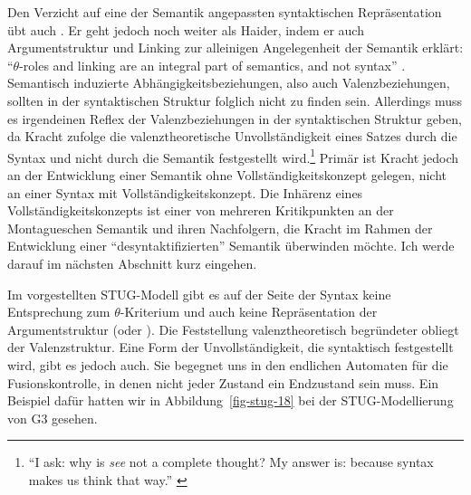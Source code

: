 {Den Verzicht auf eine der Semantik angepassten syntaktischen Repräsentation übt auch \cite{Kracht:07,Kracht:11}. Er geht jedoch noch weiter als Haider, indem er auch Argumentstruktur und Linking zur alleinigen Angelegenheit der Semantik erklärt: "`$\theta$-roles and linking are an integral part of semantics, and not syntax"' \citep[48]{Kracht:07}. Semantisch induzierte Abhängigkeitsbeziehungen, also auch Valenzbeziehungen, sollten in der syntaktischen Struktur folglich nicht zu finden sein. Allerdings muss es irgendeinen Reflex der Valenzbeziehungen in der syntaktischen Struktur geben, da Kracht zufolge die valenztheoretische Unvollständigkeit eines Satzes durch die Syntax und nicht durch die Semantik festgestellt wird.\footnote{"`I ask: why is {\it see} not a complete thought? My answer is: because syntax makes us think that way."' \citep[55]{Kracht:07}} Primär ist Kracht jedoch an der Entwicklung einer Semantik ohne Vollständigkeitskonzept gelegen, nicht an einer Syntax mit Vollständigkeitskonzept. Die Inhärenz eines Vollständigkeitskonzepts ist einer von mehreren Kritikpunkten an der Montagueschen Semantik und ihren Nachfolgern, die Kracht im Rahmen der Entwicklung einer "`desyntaktifizierten"' Semantik überwinden möchte. Ich werde darauf im nächsten Abschnitt kurz eingehen.%



Im vorgestellten STUG-Modell gibt es auf der Seite der Syntax keine Entsprechung zum $\theta$-Kriterium und auch keine Repräsentation der Argumentstruktur (oder ). Die Feststellung valenztheoretisch begründeter  obliegt der Valenzstruktur. Eine Form der Unvollständigkeit, die syntaktisch festgestellt wird, gibt es jedoch auch. Sie begegnet uns in den endlichen Automaten für die Fusionskontrolle, in denen nicht jeder Zustand ein Endzustand sein muss. Ein Beispiel dafür hatten wir in Abbildung~\ref{fig-stug-18} bei der STUG-Modellierung von G3 gesehen.

}
